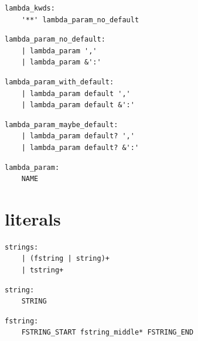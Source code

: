\noindent\textbf{\texttt{}}\par
\begin{lstlisting}
lambda_kwds:
    '**' lambda_param_no_default
\end{lstlisting}

\noindent\textbf{\texttt{}}\par
\begin{lstlisting}
lambda_param_no_default:
    | lambda_param ','
    | lambda_param &':'
\end{lstlisting}

\noindent\textbf{\texttt{}}\par
\begin{lstlisting}
lambda_param_with_default:
    | lambda_param default ','
    | lambda_param default &':'
\end{lstlisting}

\noindent\textbf{\texttt{}}\par
\begin{lstlisting}
lambda_param_maybe_default:
    | lambda_param default? ','
    | lambda_param default? &':'
\end{lstlisting}

\noindent\textbf{\texttt{}}\par
\begin{lstlisting}
lambda_param:
    NAME
\end{lstlisting}

\section{literals}

\noindent\textbf{\texttt{}}\par
\begin{lstlisting}
strings:
    | (fstring | string)+
    | tstring+
\end{lstlisting}

\noindent\textbf{\texttt{}}\par
\begin{lstlisting}
string:
    STRING
\end{lstlisting}

\noindent\textbf{\texttt{}}\par
\begin{lstlisting}
fstring:
    FSTRING_START fstring_middle* FSTRING_END
\end{lstlisting}

